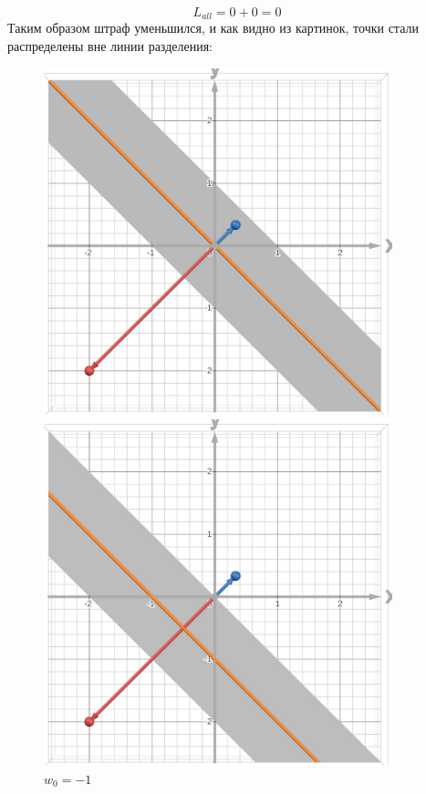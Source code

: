 \[
    L_{all} = 0 + 0 = 0
\]
Таким образом штраф уменьшился, и как видно из картинок, точки стали распределены вне линии разделения:
\begin{figure}[ht]
    \centering
    \begin{minipage}{0.45\textwidth}
        \centering
        \includegraphics[width=0.9\textwidth]{chapters/clustering/images/TSVM_3task1.jpg}
        \caption{$w_0 = 0$}
    \end{minipage}
    \hfill
    \begin{minipage}{0.45\textwidth}
        \centering
        \includegraphics[width=0.9\textwidth]{chapters/clustering/images/TSVM_3task2.jpg}
        \caption{$w_0 = -1$}
    \end{minipage}
\end{figure}


